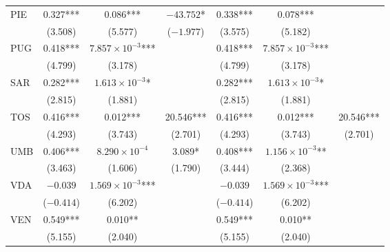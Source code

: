 \documentclass[12pt]{article}
\begin{document}
\begin{appendices}
\begin{longtable}{@{}lcccccc@{}}
            PIE & 0.327*** & 0.086*** & $-43.752$* & 0.338*** & 0.078*** &  \\ 
             & (3.508) & (5.577) & ($-1.977$) & (3.575) & (5.182) &  \\ 
            PUG & 0.418*** & $7.857 \times 10^{-3}$*** &  & 0.418*** & $7.857 \times 10^{-3}$*** &  \\ 
             & (4.799) & (3.178) &  & (4.799) & (3.178) &  \\ 
            SAR & 0.282*** & $1.613 \times 10^{-3}$* &  & 0.282*** & $1.613 \times 10^{-3}$* &  \\ 
             & (2.815) & (1.881) &  & (2.815) & (1.881) &  \\ 
            TOS & 0.416*** & 0.012*** & 20.546*** & 0.416*** & 0.012*** & 20.546*** \\ 
             & (4.293) & (3.743) & (2.701) & (4.293) & (3.743) & (2.701) \\ 
            UMB & 0.406*** & $8.290 \times 10^{-4}$ & 3.089* & 0.408*** & $1.156 \times 10^{-3}$** &  \\ 
             & (3.463) & (1.606) & (1.790) & (3.444) & (2.368) &  \\ 
            VDA & $-0.039$ & $1.569 \times 10^{-3}$*** &  & $-0.039$ & $1.569 \times 10^{-3}$*** &  \\
             & ($-0.414$) & (6.202) &  & ($-0.414$) & (6.202) &  \\ 
            VEN & 0.549*** & 0.010** &  & 0.549*** & 0.010** &  \\ 
             & (5.155) & (2.040) &  & (5.155) & (2.040) &  \\* \bottomrule
    	\end{longtable}
		

\end{appendices}
\end{document}
